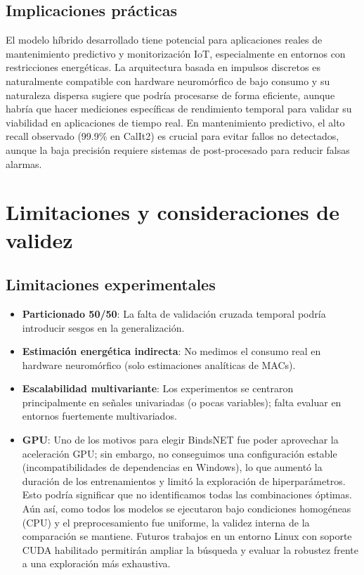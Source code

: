 \subsection{Implicaciones prácticas}
El modelo híbrido desarrollado tiene potencial para aplicaciones reales de mantenimiento predictivo y monitorización IoT, especialmente en entornos con restricciones energéticas. La arquitectura basada en impulsos discretos es naturalmente compatible con hardware neuromórfico de bajo consumo y su naturaleza dispersa sugiere que podría procesarse de forma eficiente, aunque habría que hacer mediciones específicas de rendimiento temporal para validar su viabilidad en aplicaciones de tiempo real. En mantenimiento predictivo, el alto recall observado (99.9\% en CalIt2) es crucial para evitar fallos no detectados, aunque la baja precisión requiere sistemas de post-procesado para reducir falsas alarmas.


\section{Limitaciones y consideraciones de validez}
\subsection{Limitaciones experimentales}
\begin{itemize}
    \item \textbf{Particionado 50/50}: La falta de validación cruzada temporal podría introducir sesgos en la generalización.
    \item \textbf{Estimación energética indirecta}: No medimos el consumo real en hardware neuromórfico (solo estimaciones analíticas de MACs).
    \item \textbf{Escalabilidad multivariante}: Los experimentos se centraron principalmente en señales univariadas (o pocas variables); falta evaluar en entornos fuertemente multivariados.
    \item \textbf{GPU}: Uno de los motivos para elegir BindsNET fue poder aprovechar la aceleración GPU; sin embargo, no conseguimos una configuración estable (incompatibilidades de dependencias en Windows), lo que aumentó la duración de los entrenamientos y limitó la exploración de hiperparámetros. Esto podría significar que no identificamos todas las combinaciones óptimas. Aún así, como todos los modelos se ejecutaron bajo condiciones homogéneas (CPU) y el preprocesamiento fue uniforme, la validez interna de la comparación se mantiene. Futuros trabajos en un entorno Linux con soporte CUDA habilitado permitirán ampliar la búsqueda y evaluar la robustez frente a una exploración más exhaustiva.
\end{itemize}

